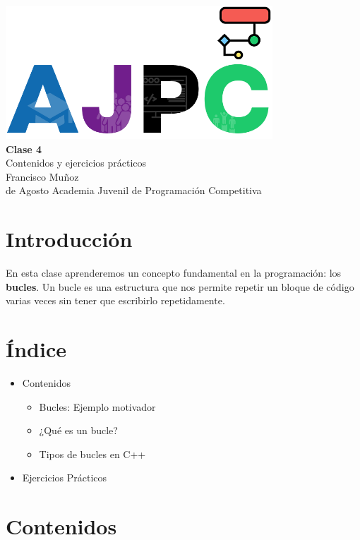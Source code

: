 \documentclass{article}
\newcommand{\documentTitle}{Clase 4}
\newcommand{\documentSubtitle}{Contenidos y ejercicios prácticos}
\newcommand{\documentAuthor}{Francisco Muñoz}
\newcommand{\documentDate}{16 de Agosto}
\begin{document}
\thispagestyle{empty}
\AddToShipoutPictureBG*{}
\begin{center}
    \vspace*{2cm}
    \includegraphics[width=0.75\textwidth]{logo.png} \\[1.5cm]
    {\Huge \textbf{\documentTitle}} \\[0.5cm]
    {\Large \documentSubtitle} \\[1.5cm]
    {\large \documentAuthor} \\[0.5cm]
    {\large \space \space \documentDate}
    \vfill
    {\large Academia Juvenil de Programación Competitiva}
\end{center}
\newpage

\section{Introducción}

En esta clase aprenderemos un concepto fundamental en la programación: los \textbf{bucles}.
Un bucle es una estructura que nos permite repetir un bloque de código varias veces sin tener que escribirlo repetidamente.

\section{Índice}

\begin{itemize}
    \item Contenidos
    \begin{itemize}
        \item Bucles: Ejemplo motivador
        \item ¿Qué es un bucle?
        \item Tipos de bucles en C++
    \end{itemize}
    \item Ejercicios Prácticos
\end{itemize}

\section{Contenidos}
\end{document}
